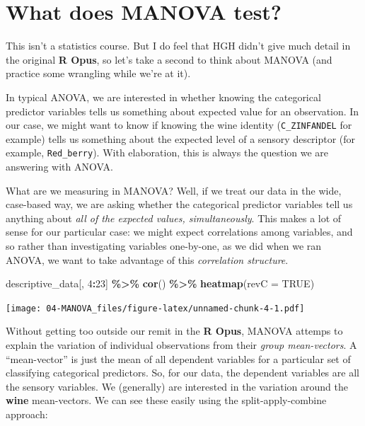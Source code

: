 \documentclass[
]{book}
\newenvironment{Shaded}{\begin{snugshade}}{\end{snugshade}}
\newcommand{\AttributeTok}[1]{\textcolor[rgb]{0.13,0.29,0.53}{#1}}
\newcommand{\ConstantTok}[1]{\textcolor[rgb]{0.56,0.35,0.01}{#1}}
\newcommand{\DecValTok}[1]{\textcolor[rgb]{0.00,0.00,0.81}{#1}}
\newcommand{\FunctionTok}[1]{\textcolor[rgb]{0.13,0.29,0.53}{\textbf{#1}}}
\newcommand{\NormalTok}[1]{#1}
\newcommand{\SpecialCharTok}[1]{\textcolor[rgb]{0.81,0.36,0.00}{\textbf{#1}}}
\begin{document}
\section{What does MANOVA test?}\label{what-does-manova-test}

This isn't a statistics course. But I do feel that HGH didn't give much detail in the original \textbf{R Opus}, so let's take a second to think about MANOVA (and practice some wrangling while we're at it).

In typical ANOVA, we are interested in whether knowing the categorical predictor variables tells us something about expected value for an observation. In our case, we might want to know if knowing the wine identity (\texttt{C\_ZINFANDEL} for example) tells us something about the expected level of a sensory descriptor (for example, \texttt{Red\_berry}). With elaboration, this is always the question we are answering with ANOVA.

What are we measuring in MANOVA? Well, if we treat our data in the wide, case-based way, we are asking whether the categorical predictor variables tell us anything about \emph{all of the expected values, simultaneously}. This makes a lot of sense for our particular case: we might expect correlations among variables, and so rather than investigating variables one-by-one, as we did when we ran ANOVA, we want to take advantage of this \emph{correlation structure}.

\begin{Shaded}
\begin{Highlighting}[]
\NormalTok{descriptive\_data[, }\DecValTok{4}\SpecialCharTok{:}\DecValTok{23}\NormalTok{] }\SpecialCharTok{\%\textgreater{}\%}
  \FunctionTok{cor}\NormalTok{() }\SpecialCharTok{\%\textgreater{}\%} 
  \FunctionTok{heatmap}\NormalTok{(}\AttributeTok{revC =} \ConstantTok{TRUE}\NormalTok{)}
\end{Highlighting}
\end{Shaded}

\texttt{[image: 04-MANOVA\_files/figure-latex/unnamed-chunk-4-1.pdf]}

Without getting too outside our remit in the \textbf{R Opus}, MANOVA attemps to explain the variation of individual observations from their \emph{group mean-vectors}. A ``mean-vector'' is just the mean of all dependent variables for a particular set of classifying categorical predictors. So, for our data, the dependent variables are all the sensory variables. We (generally) are interested in the variation around the \textbf{wine} mean-vectors. We can see these easily using the split-apply-combine approach:
\end{document}
